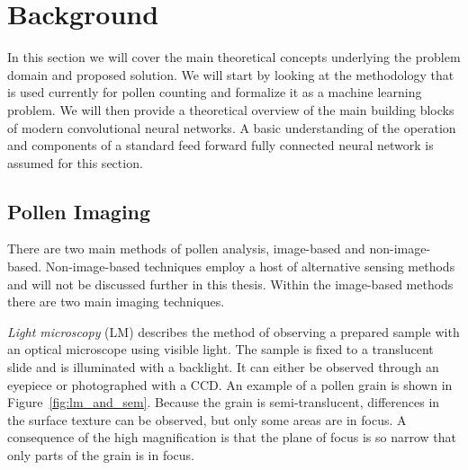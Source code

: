 \chapter{Background}\label{cha:background}
In this section we will cover the main theoretical concepts underlying the problem domain and proposed solution.
We will start by looking at the methodology that is used currently for pollen counting and formalize it as a machine learning problem.
We will then provide a theoretical overview of the main building blocks of modern convolutional neural networks.
A basic understanding of the operation and components of a standard feed forward fully connected neural network is assumed for this section.

\section{Pollen Imaging}
There are two main methods of pollen analysis, image-based and non-image-based.
Non-image-based techniques employ a host of alternative sensing methods and will not be discussed further in this thesis.
Within the image-based methods there are two main imaging techniques.

\textit{Light microscopy} (LM) describes the method of observing a prepared sample with an optical microscope using visible light.
The sample is fixed to a translucent slide and is illuminated with a backlight.
It can either be observed through an eyepiece or photographed with a CCD\@.
An example of a pollen grain is shown in Figure~\ref{fig:lm_and_sem}.
Because the grain is semi-translucent, differences in the surface texture can be observed, but only some areas are in focus.
A consequence of the high magnification is that the plane of focus is so narrow that only parts of the grain is in focus.

